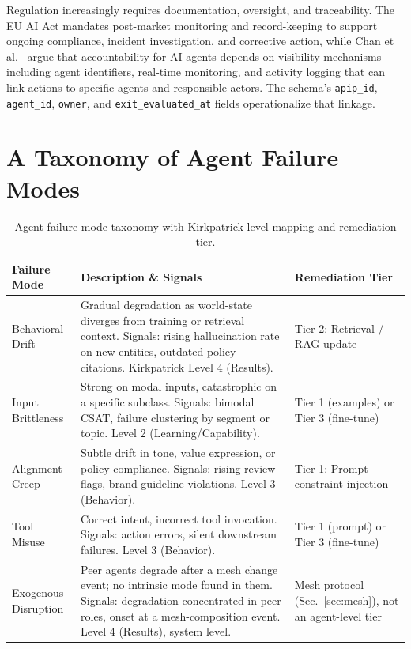\documentclass[conference]{IEEEtran}
\newcommand{\code}[1]{\texttt{\small #1}}
\begin{document}
Regulation increasingly requires documentation, oversight, and traceability.
The EU AI Act \cite{euaiact} mandates post-market monitoring and record-keeping to support ongoing compliance, incident investigation, and corrective action,
while Chan et al.\ \cite{chan2024} argue that accountability for AI agents depends on
visibility mechanisms including agent identifiers, real-time monitoring, and activity logging that can link actions to specific agents and responsible actors.
The schema's \code{apip\_id}, \code{agent\_id}, \code{owner}, and \code{exit\_evaluated\_at}
fields operationalize that linkage.

\section{A Taxonomy of Agent Failure Modes}
\label{sec:taxonomy}

\begin{table}[t]
\caption{Agent failure mode taxonomy with Kirkpatrick level mapping and
remediation tier.}
\label{tab:taxonomy}
\centering
\scriptsize
\setlength{\tabcolsep}{4pt}
\begin{tabular}{@{}p{1.5cm}p{5.0cm}p{1.7cm}@{}}
\toprule
\textbf{Failure Mode} & \textbf{Description \& Signals} & \textbf{Remediation
Tier} \\
\midrule
Behavioral Drift &
Gradual degradation as world-state diverges from training or retrieval context.
Signals: rising hallucination rate on new entities, outdated policy citations.
Kirkpatrick Level 4 (Results). &
Tier 2: Retrieval / RAG update \\
Input Brittleness &
Strong on modal inputs, catastrophic on a specific subclass. Signals: bimodal
CSAT, failure clustering by segment or topic. Level 2 (Learning/Capability). &
Tier 1 (examples) or Tier 3 (fine-tune) \\
Alignment Creep &
Subtle drift in tone, value expression, or policy compliance. Signals: rising
review flags, brand guideline violations. Level 3 (Behavior). &
Tier 1: Prompt constraint injection \\
Tool Misuse &
Correct intent, incorrect tool invocation. Signals: action errors, silent
downstream failures. Level 3 (Behavior). &
Tier 1 (prompt) or Tier 3 (fine-tune) \\
Exogenous Disruption &
Peer agents degrade after a mesh change event; no intrinsic mode found in them.
Signals: degradation concentrated in peer roles, onset at a mesh-composition
event. Level 4 (Results), system level. &
Mesh protocol (Sec.~\ref{sec:mesh}), not an agent-level tier \\
\bottomrule
\end{tabular}
\end{table}
\end{document}
